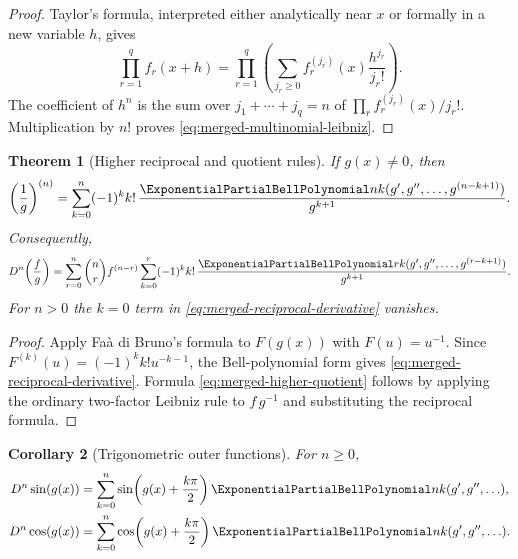 \documentclass[11pt,a4paper,oneside,openany]{book}
\newtheorem{theorem}{Theorem}[chapter]
\newtheorem{corollary}[theorem]{Corollary}
\theoremstyle{definition}
\theoremstyle{remark}
\begin{document}
\begin{proof}
Taylor's formula, interpreted either analytically near $x$ or formally in a
new variable $h$, gives
\[
 \prod_{r=1}^{q}f_r(x+h)
 =\prod_{r=1}^{q}\left(\sum_{j_r\geq0}
       f_r^{(j_r)}(x)\frac{h^{j_r}}{j_r!}\right).
\]
The coefficient of $h^n$ is the sum over $j_1+\cdots+j_q=n$ of
$\prod_r f_r^{(j_r)}(x)/j_r!$.  Multiplication by $n!$ proves
\eqref{eq:merged-multinomial-leibniz}.
\end{proof}

\begin{theorem}[Higher reciprocal and quotient rules]
\label{thm:merged-higher-quotient}
If $g(x)\ne0$, then
\begin{equation}
 \left(\frac1g\right)^{(n)}
 =\sum_{k=0}^{n}(-1)^k k!\,
   \frac{\ExponentialPartialBellPolynomial nk(g',g'',\ldots,g^{(n-k+1)})}{g^{k+1}}.           \label{eq:merged-reciprocal-derivative}
\end{equation}
Consequently,
\begin{equation}
 D^n\!\left(\frac fg\right)
 =\sum_{r=0}^{n}\binom nr f^{(n-r)}
   \sum_{k=0}^{r}(-1)^k k!\,
   \frac{\ExponentialPartialBellPolynomial rk(g',g'',\ldots,g^{(r-k+1)})}{g^{k+1}}.          \label{eq:merged-higher-quotient}
\end{equation}
For $n>0$ the $k=0$ term in
\eqref{eq:merged-reciprocal-derivative} vanishes.
\end{theorem}

\begin{proof}
Apply Fa\`a di Bruno's formula to $F(g(x))$ with $F(u)=u^{-1}$.  Since
$F^{(k)}(u)=(-1)^k k!u^{-k-1}$, the Bell-polynomial form gives
\eqref{eq:merged-reciprocal-derivative}.  Formula
\eqref{eq:merged-higher-quotient} follows by applying the ordinary two-factor
Leibniz rule to $f\,g^{-1}$ and substituting the reciprocal formula.
\end{proof}

\begin{corollary}[Trigonometric outer functions]
For $n\geq0$,
\begin{align}
 D^n\sin(g(x))
 &=\sum_{k=0}^{n}\sin\!\left(g(x)+\frac{k\pi}{2}\right)
   \ExponentialPartialBellPolynomial nk(g',g'',\ldots),                                      \label{eq:merged-sin-composite}\\
 D^n\cos(g(x))
 &=\sum_{k=0}^{n}\cos\!\left(g(x)+\frac{k\pi}{2}\right)
   \ExponentialPartialBellPolynomial nk(g',g'',\ldots).                                      \label{eq:merged-cos-composite}
\end{align}
\end{corollary}
\end{document}

